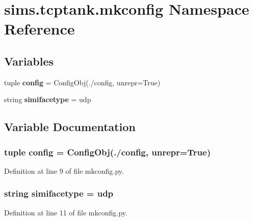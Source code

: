 \section{sims.\+tcptank.\+mkconfig Namespace Reference}
\label{namespacesims_1_1tcptank_1_1mkconfig}
\subsection*{Variables}
\begin{DoxyCompactItemize}
\item 
tuple {\bf config} = Config\+Obj(\textquotesingle{}./config\textquotesingle{}, unrepr=True)
\item 
string {\bf simifacetype} = \textquotesingle{}udp\textquotesingle{}
\end{DoxyCompactItemize}


\subsection{Variable Documentation}
\subsubsection[{config}]{\setlength{\rightskip}{0pt plus 5cm}tuple config = Config\+Obj(\textquotesingle{}./config\textquotesingle{}, unrepr=True)}\label{namespacesims_1_1tcptank_1_1mkconfig_ad5f91786d7c873886a576621a2c1b0b5}


Definition at line 9 of file mkconfig.\+py.

\subsubsection[{simifacetype}]{\setlength{\rightskip}{0pt plus 5cm}string simifacetype = \textquotesingle{}udp\textquotesingle{}}\label{namespacesims_1_1tcptank_1_1mkconfig_a7f5f5e89422cd15dfc1af6d7593d69c7}


Definition at line 11 of file mkconfig.\+py.

